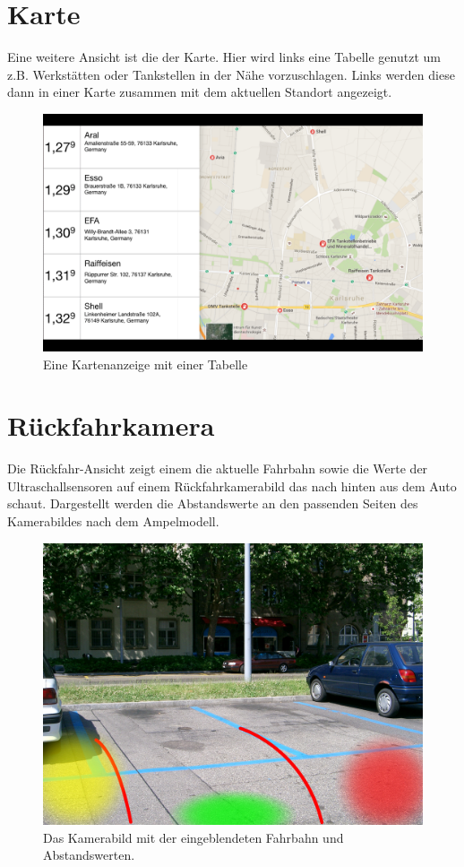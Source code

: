 \documentclass[pflichtenheft.tex]{subfiles}
\begin{document}
\clearpage
\section{Karte}
\label{sec:Karte}

Eine weitere Ansicht ist die der Karte. Hier wird links eine Tabelle genutzt um z.B. Werkstätten oder Tankstellen in der Nähe vorzuschlagen. Links werden diese dann in einer Karte zusammen mit dem aktuellen Standort angezeigt.

\begin{figure}[H]
  	\begin{center}
 		\includegraphics[width=\textwidth]{Images/GUI-Map.png}
  		\caption{Eine Kartenanzeige mit einer Tabelle}
  	\end{center}
\end{figure}

\clearpage
\section{Rückfahrkamera}

Die Rückfahr-Ansicht zeigt einem die aktuelle Fahrbahn sowie die Werte der Ultraschallsensoren auf einem Rückfahrkamerabild das nach hinten aus dem Auto schaut. Dargestellt werden die Abstandswerte an den passenden Seiten des Kamerabildes nach dem Ampelmodell.

\begin{figure}[H]
  	\begin{center}
 		\includegraphics[width=\textwidth]{Images/GUI-BackDrive.jpg}
  		\caption{Das Kamerabild mit der eingeblendeten Fahrbahn und Abstandswerten.}
  	\end{center}
\end{figure}
\end{document}

